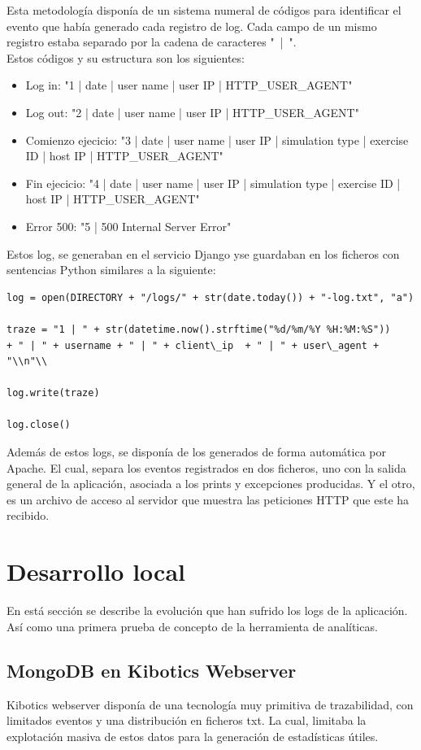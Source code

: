 \documentclass[11pt,a4paper]{book}
\begin{document}
			Esta metodología disponía de un sistema numeral de códigos para identificar el evento que había generado cada registro de log. Cada campo de un mismo registro estaba separado por la cadena de caracteres "\ |\ ".\\
			
			Estos códigos y su estructura son los siguientes:
			\begin{itemize}
				\item Log in: "1 | date | user name | user IP | HTTP\_USER\_AGENT"
				\item Log out: "2 | date | user name | user IP | HTTP\_USER\_AGENT"
				\item Comienzo ejecicio: "3 | date | user name | user IP | simulation type | exercise ID | host IP | HTTP\_USER\_AGENT"
				\item Fin ejecicio: "4 | date | user name | user IP | simulation type | exercise ID | host IP | HTTP\_USER\_AGENT"
				\item Error 500: "5 | 500 Internal Server Error"
			\end{itemize}
			Estos log, se generaban en el servicio Django yse guardaban en los ficheros con sentencias Python similares a la siguiente:
			
			\begin{Verbatim}[tabsize=4]
log = open(DIRECTORY + "/logs/" + str(date.today()) + "-log.txt", "a")

traze = "1 | " + str(datetime.now().strftime("%d/%m/%Y %H:%M:%S")) 
+ " | " + username + " | " + client\_ip  + " | " + user\_agent + "\\n"\\

log.write(traze)

log.close()	
			\end{Verbatim}
			
			Además de estos logs, se disponía de los generados de forma automática por Apache. El cual, separa los eventos registrados en dos ficheros, uno con la salida general de la aplicación, asociada a los prints y excepciones producidas. Y el otro, es un archivo de acceso al servidor que muestra las peticiones HTTP que este ha recibido.
		\section{Desarrollo local}
			En está sección se describe la evolución que han sufrido los logs de la aplicación. Así como una primera prueba de concepto de la herramienta de analíticas.
			\subsection{MongoDB en Kibotics Webserver}
			Kibotics webserver disponía de una tecnología muy primitiva de trazabilidad, con limitados eventos y una distribución en ficheros txt. La cual, limitaba la explotación masiva de estos datos para la generación de estadísticas útiles.\\
			
\end{document}
